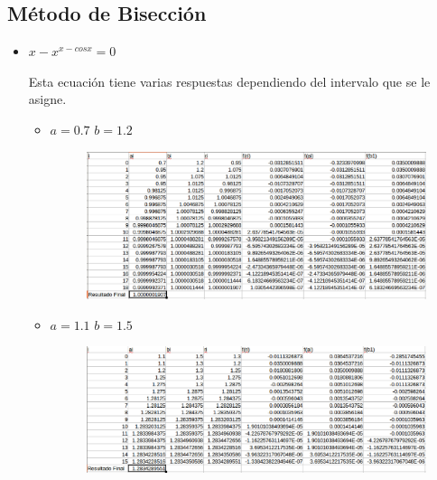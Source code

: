 \documentclass[a4paper,12pt]{article}
\begin{document}
    \subsection{Método de Bisección}
    
    \begin{itemize}
     \item $x-x^{x-cosx} = 0$ 
     
     Esta ecuación tiene varias respuestas dependiendo del intervalo que se le asigne.
     
     \begin{itemize}
      \item $a = 0.7$ $b = 1.2$
      \begin{figure}[h]
      \centering
      \includegraphics[scale = 0.4]{21.eps}
     \end{figure}
      
      \newpage
      
      \item $a = 1.1$ $b = 1.5$
      
      \begin{figure}[h]
      \centering
      \includegraphics[scale = 0.4]{212.eps}
     \end{figure}
      
     \end{itemize}

     
     
     
     

\end{itemize}
\end{document}
